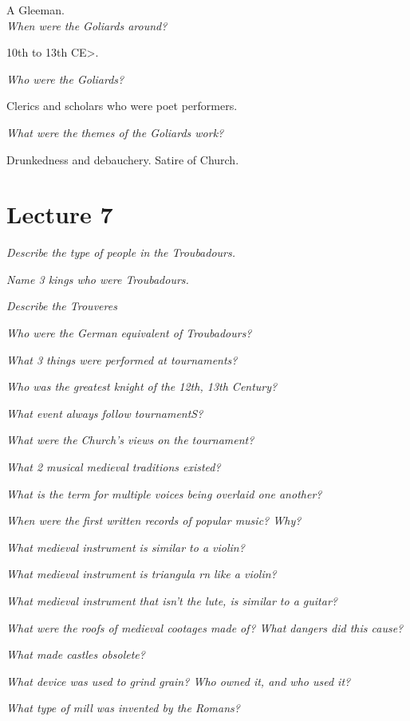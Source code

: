 \documentclass[12pt]{article}
\begin{document}
A Gleeman.\\


\textit{When were the Goliards around?}

10th to 13th CE>.

\textit{Who were the Goliards?}

Clerics and scholars who were poet performers.

\textit{What were the themes of the Goliards work?}

Drunkedness and debauchery. Satire of Church.\\

\section*{Lecture 7}

\textit{Describe the type of people in the Troubadours.}

\textit{Name 3 kings who were Troubadours.}

\textit{Describe the Trouveres}

\textit{Who were the German equivalent of Troubadours?}

\textit{What 3 things were performed at tournaments?}

\textit{Who was the greatest knight of the 12th, 13th Century?}

\textit{What event always follow tournamentS?}

\textit{What were the Church's views on the tournament?}

\textit{What 2 musical medieval traditions existed?}

\textit{What is the term for multiple voices being overlaid one another?}

\textit{When were the first written records of popular music? Why?}

\textit{What medieval instrument is similar to a violin?}

\textit{What medieval instrument is triangula rn like a violin?}

\textit{What medieval instrument that isn't the lute, is similar to a guitar?}

\textit{What were the roofs of medieval cootages made of? What dangers did this cause?}

\textit{What made castles obsolete?}

\textit{What device was used to grind grain? Who owned it, and who used it?}

\textit{What type of mill was invented by the Romans?}
\end{document}
